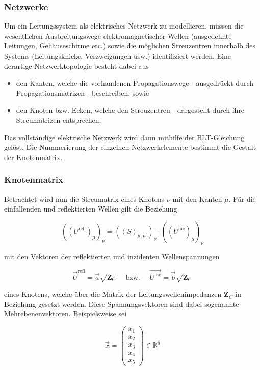 \subsubsection{Netzwerke}
Um ein Leitungssystem als elektrisches Netzwerk zu modellieren, müssen die wesentlichen Ausbreitungswege elektromagnetischer Wellen (ausgedehnte Leitungen, Gehäuseschirme etc.) sowie die möglichen Streuzentren innerhalb des Systems (Leitungsknicke, Verzweigungen usw.) identifiziert werden. Eine derartige Netzwerktopologie besteht dabei aus

\begin{itemize}
	\item den Kanten, welche die vorhandenen Propagationswege - ausgedrückt durch Propagationsmatrizen - beschreiben, sowie
	\item den Knoten bzw. Ecken, welche den Streuzentren - dargestellt durch ihre Streumatrizen entsprechen.
\end{itemize}

Das vollständige elektrische Netzwerk wird dann mithilfe der BLT-Gleichung gelöst. Die Nummerierung der einzelnen Netzwerkelemente bestimmt die Gestalt der Knotenmatrix. 

\subsubsection{Knotenmatrix}
Betrachtet wird nun die Streumatrix eines Knotens $\nu$ mit den Kanten $\mu$. Für die einfallenden und reflektierten Wellen gilt die Beziehung


\begin{equation}
	\left(\left(U^{\mathrm{refl}}\right)_{\mu}\right)_{\nu}=\left((S)_{\mu, \mu^{\prime}}\right)_{\nu} \cdot\left(\left(U^{\mathrm{inc}}\right)_{\mu}\right)_{\nu} 
\end{equation}


mit den Vektoren der reflektierten und inzidenten Wellenspannungen


\begin{equation}
	\vec{U}^{\mathrm{refl}}=\vec{a} \sqrt{\mathbf{Z}_{\mathrm{C}}} \quad \text { bzw. } \quad \overrightarrow{U^{\mathrm{inc}}}=\vec{b} \sqrt{\mathbf{Z}_{\mathrm{C}}} 
\end{equation}


eines Knotens, welche über die Matrix der Leitungswellenimpedanzen $\mathbf{Z}_{C}$ in Beziehung gesetzt werden. Diese Spannungsvektoren sind dabei sogenannte Mehrebenenvektoren. Beispielsweise sei

\begin{equation}
	\vec{x}=\left(\begin{array}{l}
		x_{1}  \\
		x_{2} \\
		x_{3} \\
		x_{4} \\
		x_{5}
	\end{array}\right) \in \mathbb{K}^{5}
\end{equation}

